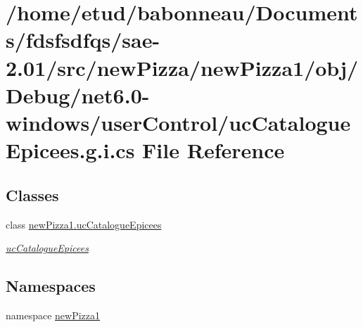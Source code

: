 \hypertarget{net6_80-windows_2userControl_2ucCatalogueEpicees_8g_8i_8cs}{}\section{/home/etud/babonneau/\+Documents/fdsfsdfqs/sae-\/2.01/src/new\+Pizza/new\+Pizza1/obj/\+Debug/net6.0-\/windows/user\+Control/uc\+Catalogue\+Epicees.g.\+i.\+cs File Reference}
\label{net6_80-windows_2userControl_2ucCatalogueEpicees_8g_8i_8cs}
\subsection*{Classes}
\begin{DoxyCompactItemize}
\item 
class \hyperlink{classnewPizza1_1_1ucCatalogueEpicees}{new\+Pizza1.\+uc\+Catalogue\+Epicees}
\begin{DoxyCompactList}\small\item\em \hyperlink{classnewPizza1_1_1ucCatalogueEpicees}{uc\+Catalogue\+Epicees} \end{DoxyCompactList}\end{DoxyCompactItemize}
\subsection*{Namespaces}
\begin{DoxyCompactItemize}
\item 
namespace \hyperlink{namespacenewPizza1}{new\+Pizza1}
\end{DoxyCompactItemize}
